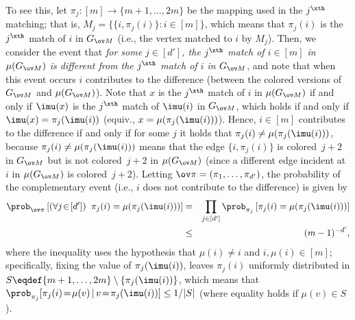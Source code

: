 To see this, let $\pi_j:[m]\to\{m+1,\ldots,2m\}$
be the mapping used in the $j^\xth$ matching;
that is, $M_j=\{\{i,\pi_j(i)\}:i\!\in\![m]\}$,
which means that $\pi_j(i)$ is the $j^\xth$ match of $i$ in $G_{\ov M}$
(i.e., the vertex matched to $i$ by $M_j$).
Then, we consider the event that {\em for some $j\in[d']$,
the $j^\xth$ match of $i\in[m]$ in $\mu(G_{\ov M})$
is different from the $j^\xth$ match of $i$ in $G_{\ov M}$},
and note that when this event occurs $i$ contributes to the difference
(between the colored versions of $G_{\ov M}$ and $\mu(G_{\ov M})$).
Note that $x$ is the $j^\xth$ match of $i$ in $\mu(G_{\ov M})$
if and only if $\imu(x)$ is the $j^\xth$ match of $\imu(i)$ in $G_{\ov M}$,
which holds if and only if $\imu(x)=\pi_j(\imu(i))$
(equiv., $x=\mu(\pi_j(\imu(i)))$).
Hence, $i\in[m]$ contributes to the difference if and only if
for some $j$ it holds that $\pi_j(i)\neq\mu(\pi_j(\imu(i)))$,
because $\pi_j(i)\neq\mu(\pi_j(\imu(i)))$ means that
the edge $\{i,\pi_j(i)\}$ is colored~$j+2$ in $G_{\ov M}$
but is not colored~$j+2$ in $\mu(G_{\ov M})$
(since a different edge incident at~$i$ in $\mu(G_{\ov M})$
is colored~$j+2$).
%
%
Letting ${\ov\pi}=(\pi_1,\ldots,\pi_{d'})$,
the probability of the complementary event
(i.e., $i$ does not contribute to the difference)
is given by
\begin{eqnarray*}
\prob_{\ov\pi}
  \left[(\forall j\!\in\![d'])\;\;\pi_j(i)=\mu(\pi_j(\imu(i)))\right]
&=& \prod_{j\in[d']}
    \prob_{\pi_j}\left[\pi_j(i)=\mu(\pi_j(\imu(i)))\right] \\
&\leq& (m-1)^{-d'},
\end{eqnarray*}
where the inequality uses the hypothesis
that $\mu(i)\neq i$ and $i,\mu(i)\!\in\![m]$;
specifically, fixing the value of $\pi_j(\imu(i))$,
leaves $\pi_j(i)$ uniformly distributed
in $S\eqdef\{m+1,\ldots,2m\}\setminus\{\pi_j(\imu(i))\}$,
which means that
$\prob_{\pi_j}[\pi_j(i)\!=\!\mu(v)\,|\,v\!=\!\pi_j(\imu(i))]\leq1/|S|$
(where equality holds if $\mu(v)\in S$).

